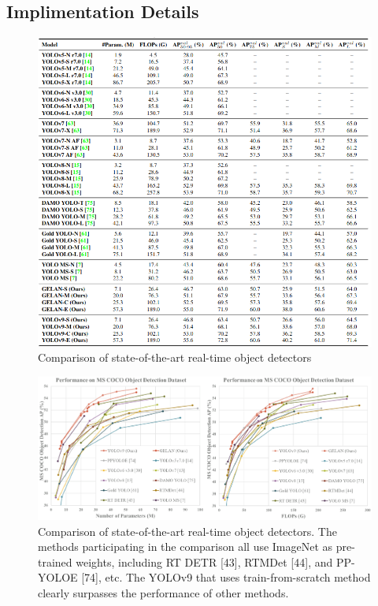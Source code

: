     \subsection{Implimentation Details}
        \begin{figure}[H]
            \centering
            \includegraphics[width=0.9\linewidth]{img/comparison.png}
            \caption{Comparison of state-of-the-art real-time object detectors}
            \label{fig:comparison}
        \end{figure}
        \begin{figure}[H]
            \centering
            \includegraphics[width=0.9\linewidth]{img/tate-of-the-art_real-time.png}
            \caption{Comparison of state-of-the-art real-time object detectors. The methods participating in the comparison all use ImageNet as pre-trained weights, including RT DETR [43], RTMDet [44], and PP-YOLOE [74], etc. The YOLOv9 that uses train-from-scratch method clearly surpasses the performance of other methods.}
            \label{fig:state-of-the-art}
        \end{figure}

